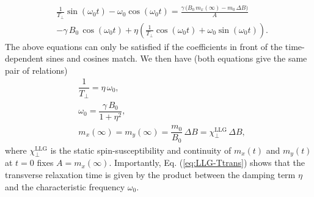 \documentclass[prb,footinbib,showpacs,twocolumn,amsmath,amssymb]{revtex4}
\newcommand{\bek}{\begin{eqnarray}}
\newcommand{\ek}{\end{eqnarray}}
\begin{document}
\begin{equation}
\begin{split}
  &\frac{1}{T_{\perp}}\sin(\omega_0 t) - \omega_0\cos(\omega_0 t) = \frac{\gamma\,\big(B_0\,m_x(\infty) - m_0\,\Delta B\big)}{A}  \\
  & -\gamma\,B_0\,\cos(\omega_0 t) + \eta\left(\frac{1}{T_{\perp}}\cos(\omega_0 t) + \omega_0\sin(\omega_0 t)\right) .
\end{split}
\end{equation}
The above equations can only be satisfied if the coefficients 
in front of the time-dependent sines and cosines match.
We then have (both equations give the same pair of relations)
\bek
  &\dfrac{1}{T_{\perp}} = \eta\,\omega_0 ,\label{eq:LLG-Ttrans}\\
 & \omega_0 = \dfrac{\gamma\,B_0}{1+\eta^2} \label{eq:LLG-wmax},\\
& m_x(\infty) = m_y(\infty) = \dfrac{m_0}{B_0}\,\Delta B = \chi_{\perp}^{\text{LLG}}\,\Delta B,
\ek
where $\chi_{\perp}^{\text{LLG}}$ is the static spin-susceptibility and 
continuity of $m_x(t)$ and  $m_y(t)$ at $t = 0$ fixes $A = m_x(\infty)$.
Importantly, 
Eq. (\ref{eq:LLG-Ttrans}) shows that the transverse relaxation time is given by the product between
the damping term $\eta$ and the characteristic frequency $\omega_0$.
\end{document}
